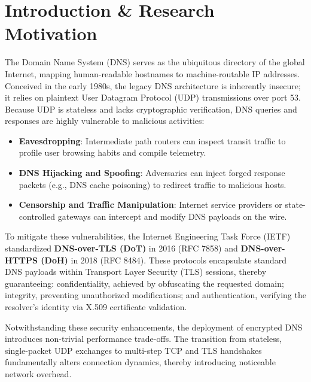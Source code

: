 \documentclass[10pt,journal,compsoc]{IEEEtran}
\begin{document}
\maketitle
\IEEEdisplaynontitleabstractindextext
\IEEEpeerreviewmaketitle

\vspace{1.5em}
\section{Introduction \& Research Motivation}
\IEEEpaperindent The Domain Name System (DNS) serves as the ubiquitous directory of the global Internet, mapping human-readable hostnames to machine-routable IP addresses. Conceived in the early 1980s, the legacy DNS architecture is inherently insecure; it relies on plaintext User Datagram Protocol (UDP) transmissions over port 53. Because UDP is stateless and lacks cryptographic verification, DNS queries and responses are highly vulnerable to malicious activities:
\begin{itemize}
    \item \textbf{Eavesdropping}: Intermediate path routers can inspect transit traffic to profile user browsing habits and compile telemetry.
    \item \textbf{DNS Hijacking and Spoofing}: Adversaries can inject forged response packets (e.g., DNS cache poisoning) to redirect traffic to malicious hosts.
    \item \textbf{Censorship and Traffic Manipulation}: Internet service providers or state-controlled gateways can intercept and modify DNS payloads on the wire.
\end{itemize}

To mitigate these vulnerabilities, the Internet Engineering Task Force (IETF) standardized \textbf{DNS-over-TLS (DoT)} in 2016 (RFC 7858) and \textbf{DNS-over-HTTPS (DoH)} in 2018 (RFC 8484). These protocols encapsulate standard DNS payloads within Transport Layer Security (TLS) sessions, thereby guaranteeing: confidentiality, achieved by obfuscating the requested domain; integrity, preventing unauthorized modifications; and authentication, verifying the resolver's identity via X.509 certificate validation.

Notwithstanding these security enhancements, the deployment of encrypted DNS introduces non-trivial performance trade-offs. The transition from stateless, single-packet UDP exchanges to multi-step TCP and TLS handshakes fundamentally alters connection dynamics, thereby introducing noticeable network overhead.
\end{document}
